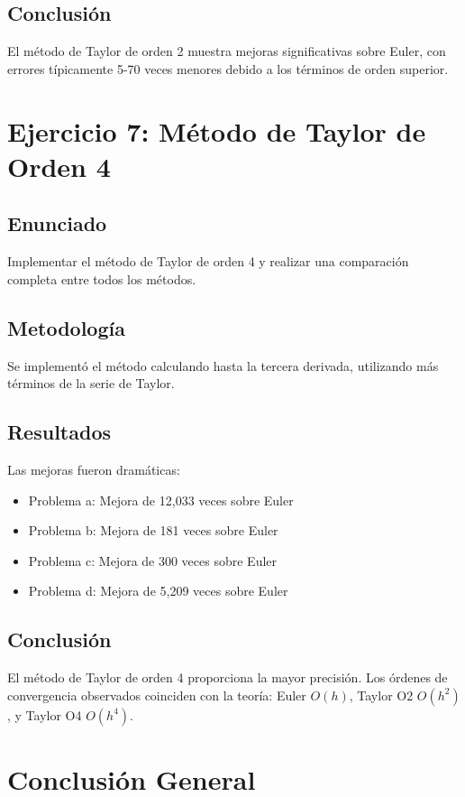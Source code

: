 \documentclass[12pt,a4paper]{article}
\begin{document}
\subsection{Conclusión}
El método de Taylor de orden 2 muestra mejoras significativas sobre Euler, con errores típicamente 5-70 veces menores debido a los términos de orden superior.

\section{Ejercicio 7: Método de Taylor de Orden 4}

\subsection{Enunciado}
Implementar el método de Taylor de orden 4 y realizar una comparación completa entre todos los métodos.

\subsection{Metodología}
Se implementó el método calculando hasta la tercera derivada, utilizando más términos de la serie de Taylor.

\subsection{Resultados}
Las mejoras fueron dramáticas:
\begin{itemize}
    \item Problema a: Mejora de 12,033 veces sobre Euler
    \item Problema b: Mejora de 181 veces sobre Euler
    \item Problema c: Mejora de 300 veces sobre Euler
    \item Problema d: Mejora de 5,209 veces sobre Euler
\end{itemize}

\subsection{Conclusión}
El método de Taylor de orden 4 proporciona la mayor precisión. Los órdenes de convergencia observados coinciden con la teoría: Euler $O(h)$, Taylor O2 $O(h^2)$, y Taylor O4 $O(h^4)$.

\section{Conclusión General}
\end{document}
